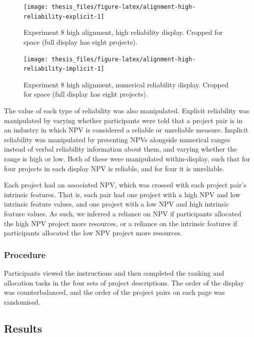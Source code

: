\documentclass[a4paper, nobind, dvipsnames]{templates/ociamthesis}
\theoremstyle{definition}
\theoremstyle{definition}
\theoremstyle{definition}
\theoremstyle{definition}
\theoremstyle{remark}
\begin{document}
\begin{figure}
\texttt{[image: thesis\_files/figure-latex/alignment-high-reliability-explicit-1]} \caption{Experiment 8 high alignment, high reliability display. Cropped for space (full display has eight projects).}\label{fig:alignment-high-reliability-explicit}
\end{figure}

\begin{figure}
\texttt{[image: thesis\_files/figure-latex/alignment-high-reliability-implicit-1]} \caption{Experiment 8 high alignment, numerical reliability display. Cropped for space (full display has eight projects).}\label{fig:alignment-high-reliability-implicit}
\end{figure}

The value of each type of reliability was also manipulated. Explicit reliability
was manipulated by varying whether participants were told that a project pair is
in an industry in which NPV is considered a reliable or unreliable measure.
Implicit reliability was manipulated by presenting NPVs alongside numerical
ranges instead of verbal reliability information about them, and varying
whether the range is high or low. Both of these were manipulated within-display,
such that for four projects in each display NPV is reliable, and for four it is
unreliable.

Each project had an associated NPV, which was crossed with each project pair's
intrinsic features. That is, each pair had one project with a high NPV and low
intrinsic feature values, and one project with a low NPV and high intrinsic
feature values. As such, we inferred a reliance on NPV if participants allocated
the high NPV project more resources, or a reliance on the intrinsic features if
participants allocated the low NPV project more resources.

\subsubsection{Procedure}

Participants viewed the instructions and then completed the ranking and
allocation tasks in the four sets of project descriptions. The order of the
display was counterbalanced, and the order of the project pairs on each page was
randomised.

\subsection{Results}
\end{document}
